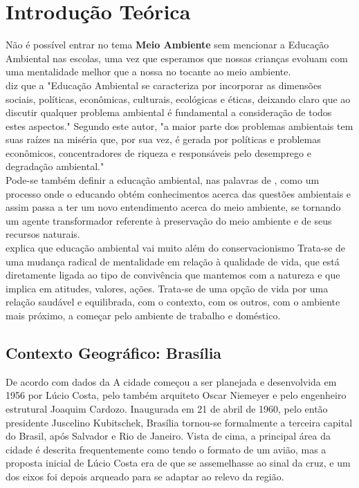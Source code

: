 \chapter{Introdução Teórica}

Não é possível entrar no tema \textbf{Meio Ambiente} sem mencionar a Educação Ambiental nas escolas, uma vez que esperamos que nossas crianças evoluam com uma mentalidade melhor que a nossa no tocante ao meio ambiente.\\

  diz que a "Educação Ambiental se caracteriza por
incorporar as dimensões sociais, políticas, econômicas,
culturais, ecológicas e éticas, deixando claro que ao discutir
qualquer problema ambiental é fundamental a consideração
de todos estes aspectos." Segundo este autor, "a maior parte
dos problemas ambientais tem suas raízes na miséria que,
por sua vez, é gerada por políticas e problemas econômicos,
concentradores de riqueza e responsáveis pelo desemprego
e degradação ambiental."\\

Pode-se também definir a educação ambiental, nas palavras de , como um processo
onde o educando obtém conhecimentos acerca das
questões ambientais e assim passa a ter um novo
entendimento acerca do meio ambiente, se tornando um
agente transformador referente à preservação do meio
ambiente e de seus recursos naturais. \\

 explica que educação ambiental vai muito além do conservacionismo
Trata-se de uma mudança radical de mentalidade em
relação à qualidade de vida, que está diretamente ligada
ao tipo de convivência que mantemos com a natureza e
que implica em atitudes, valores, ações. Trata-se de uma
opção de vida por uma relação saudável e equilibrada,
com o contexto, com os outros, com o ambiente mais
próximo, a começar pelo ambiente de trabalho e
doméstico.\\

\section{Contexto Geográfico: Brasília}

De acordo com dados da  A cidade começou a ser planejada e desenvolvida em 1956 por Lúcio Costa, pelo também arquiteto Oscar Niemeyer e pelo engenheiro estrutural Joaquim Cardozo. Inaugurada em 21 de abril de 1960, pelo então presidente Juscelino Kubitschek, Brasília tornou-se formalmente a terceira capital do Brasil, após Salvador e Rio de Janeiro. Vista de cima, a principal área da cidade é descrita frequentemente como tendo o formato de um avião, mas a proposta inicial de Lúcio Costa era de que se assemelhasse ao sinal da cruz, e um dos eixos foi depois arqueado para se adaptar ao relevo da região.\\

